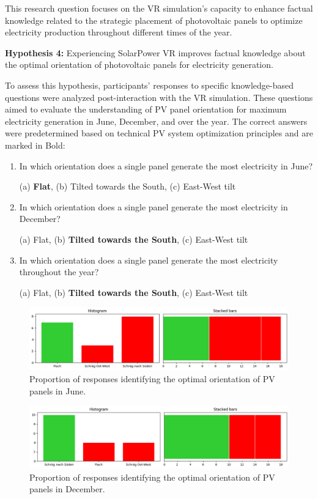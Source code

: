 \documentclass[draft, final]{vutinfth} %
\begin{document}
This research question focuses on the VR simulation's capacity to enhance factual knowledge related to the strategic placement of photovoltaic panels to optimize electricity production throughout different times of the year.

\textbf{Hypothesis 4:} Experiencing SolarPower VR improves factual knowledge about the optimal orientation of photovoltaic panels for electricity generation.

To assess this hypothesis, participants' responses to specific knowledge-based questions were analyzed post-interaction with the VR simulation. These questions aimed to evaluate the understanding of PV panel orientation for maximum electricity generation in June, December, and over the year. The correct answers were predetermined based on technical PV system optimization principles and are marked in Bold:

\begin{enumerate}
    \item In which orientation does a single panel generate the most electricity in June?
    
    (a) \textbf{Flat}, (b) Tilted towards the South, (c) East-West tilt
    \item In which orientation does a single panel generate the most electricity in December?
    
    (a) Flat, (b) \textbf{Tilted towards the South}, (c) East-West tilt
    \item In which orientation does a single panel generate the most electricity throughout the year?
    
    (a) Flat, (b) \textbf{Tilted towards the South}, (c) East-West tilt
\end{enumerate}

\begin{figure}[h]
    \centering
    \includegraphics[width=\textwidth]{graphics/test4.1.png}
    \caption[Responses for PV panel orientation in June]{Proportion of responses identifying the optimal orientation of PV panels in June.}
    \label{fig:june-orientation}
\end{figure}

\begin{figure}[h]
    \centering
    \includegraphics[width=\textwidth]{graphics/test4.2.png}
    \caption[Responses for PV panel orientation in December]{Proportion of responses identifying the optimal orientation of PV panels in December.}
    \label{fig:december-orientation}
\end{figure}
\end{document}
